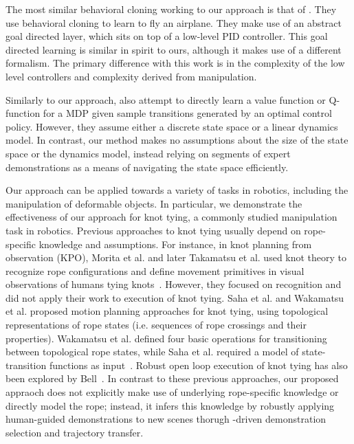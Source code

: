 The most similar behavioral cloning working to our approach is that of \citet{Isaac_ICML2003}.
They use behavioral cloning to learn to fly an airplane.
They make use of an abstract goal directed layer, which sits on top of a low-level PID controller.
This goal directed learning is similar in spirit to ours, although it makes use of a different formalism.
The primary difference with this work is in the complexity of the low level controllers and complexity derived from manipulation.

Similarly to our approach, \citet{Dvijotham_ICML2010} also attempt to directly
learn a value function or Q-function for a MDP given sample transitions
generated by an optimal control policy. However, they assume either a discrete
state space or a linear dynamics model. In contrast, our method makes no
assumptions about the size of the state space or the dynamics model, instead
relying on segments of expert demonstrations as a means of navigating the state
space efficiently. 

Our approach can be applied towards a variety of tasks in robotics,
including the manipulation of deformable objects.
In particular, we demonstrate the effectiveness of our approach for
knot tying, a commonly studied manipulation task in robotics.
Previous approaches to knot tying usually depend on rope-specific knowledge
and assumptions.
For instance, in knot planning from observation (KPO), Morita et al. and later
Takamatsu et al. used knot theory to recognize rope configurations and define
movement primitives in visual observations of humans tying
knots~\cite{Morita_ICRA2003, Takamatsu_TransRob2006}. However, they focused on
recognition and did not apply their work to execution of knot tying.
Saha et al. and Wakamatsu et al. proposed motion planning approaches for knot tying,
using topological representations of rope states (i.e. sequences of rope crossings
and their properties). Wakamatsu et al. defined four basic operations for
transitioning between topological rope states,
while Saha et al. required a model of state-transition functions
as input~\cite{Saha_ExpRobotics2008, Wakamatsu_IJRR2006}.
Robust open loop execution of knot tying has also been explored by Bell~\cite{Bell_PhD2010}.
In contrast to these previous approaches, our proposed appraoch does not
explicitly make use of underlying rope-specific
knowledge or directly model the rope; instead, it infers this knowledge by
robustly applying human-guided demonstrations to new scenes thorugh
\mmql{}-driven demonstration selection and trajectory transfer.

